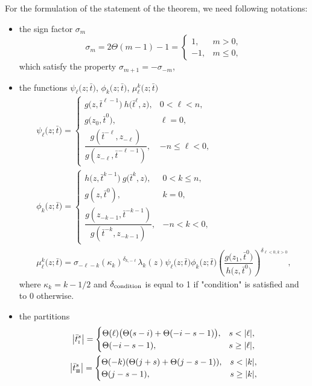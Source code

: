 \documentclass[pdftex]{sigma}
\newcommand{\so}{\scriptscriptstyle \rm I}
\newcommand{\sth}{\scriptscriptstyle \rm I\hspace{-1pt}I\hspace{-1pt}I}
\newcommand{\bt}{{\bar t}}
\theoremstyle{definition}
\begin{document}
For the formulation of the statement of the theorem, we need following
notations:
\begin{itemize}\itemsep=0pt
\item the sign factor $\sigma_m$
\[%
\sigma_m=2\Theta(m-1)-1=\begin{cases}
1,  &m>0,\\
-1,  &m\leq 0,
\end{cases}
\]
which satisfy the property
$
\sigma_{m+1}=-\sigma_{-m}$,
\item the functions $\psi_\ell\bigl(z;\bt\bigr)$, $\phi_k\bigl(z;\bt\bigr)$, $\mu^k_\ell\bigl(z;\bt\bigr)$
\begin{gather}%
\psi_\ell\bigl(z;\bt\bigr)=\begin{cases}
g\bigl(z,\bt^{\ell-1}\bigr)\ h\bigl(\bt^\ell,z\bigr), &0<\ell<n,\\
g\bigl(z_0,\bt^0\bigr), &\ell=0,\\
\dfrac{g(\bt^{-\ell},z_{-\ell})}{g(z_{-\ell},\bt^{-\ell-1})}, &-n\leq \ell<0,
\end{cases}\label{psi}
\\
\phi_k\bigl(z;\bt\bigr)=\begin{cases}
h\bigl(z,\bt^{k-1}\bigr)\ g\bigl(\bt^k,z\bigr), &0<k\leq n,\\
g(z,\bt^0), &k=0,\\
\dfrac{g(z_{-k-1},\bt^{-k-1})}{g(\bt^{-k},z_{-k-1})}, &-n< k<0,\label{phi}
\end{cases}
\\
\mu^k_\ell\bigl(z;\bt\bigr)=\sigma_{-\ell-k}
(\kappa_k)^{\delta_{k,-\ell}} \lambda_k(z) \psi_\ell\bigl(z;\bt\bigr) \phi_k\bigl(z;\bt\bigr)
\left(\dfrac{g\bigl(z_1,\bt^0\bigr)}{h\bigl(z,\bt^0\bigr)}\right)^{\delta_{\ell<0, k>0}} ,\nonumber
\end{gather}
where $\kappa_k=k-1/2$ and $\delta_{\rm condition}$ is equal to 1 if
 "condition" is satisfied and to 0 otherwise.
\item the partitions
\begin{gather}
\big|\bt^s_{\so}\big|=\begin{cases}
\Theta(\ell)\bigl(\Theta(s-i)+\Theta(-i-s-1)\bigr),& s<|\ell|,\\
\Theta(-i-s-1),& s\geq |\ell|,\label{part-so}
\end{cases}
\\
\big|\bt^s_{\sth}\big|=\begin{cases}
\Theta(-k)(\Theta(j+s)+\Theta(j-s-1)),& s<|k|,\\
\Theta(j-s-1),& s\geq |k|,

\end{cases}
\end{gather}
\end{itemize}
\end{document}
